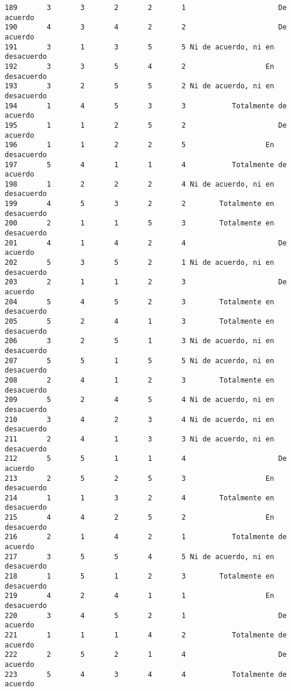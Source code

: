 \documentclass[
  letterpaper,
  DIV=11,
  numbers=noendperiod]{scrartcl}
\begin{document}
\begin{verbatim}
189       3       3       2       2       1                      De acuerdo
190       4       3       4       2       2                      De acuerdo
191       3       1       3       5       5 Ni de acuerdo, ni en desacuerdo
192       3       3       5       4       2                   En desacuerdo
193       3       2       5       5       2 Ni de acuerdo, ni en desacuerdo
194       1       4       5       3       3           Totalmente de acuerdo
195       1       1       2       5       2                      De acuerdo
196       1       1       2       2       5                   En desacuerdo
197       5       4       1       1       4           Totalmente de acuerdo
198       1       2       2       2       4 Ni de acuerdo, ni en desacuerdo
199       4       5       3       2       2        Totalmente en desacuerdo
200       2       1       1       5       3        Totalmente en desacuerdo
201       4       1       4       2       4                      De acuerdo
202       5       3       5       2       1 Ni de acuerdo, ni en desacuerdo
203       2       1       1       2       3                      De acuerdo
204       5       4       5       2       3        Totalmente en desacuerdo
205       5       2       4       1       3        Totalmente en desacuerdo
206       3       2       5       1       3 Ni de acuerdo, ni en desacuerdo
207       5       5       1       5       5 Ni de acuerdo, ni en desacuerdo
208       2       4       1       2       3        Totalmente en desacuerdo
209       5       2       4       5       4 Ni de acuerdo, ni en desacuerdo
210       3       4       2       3       4 Ni de acuerdo, ni en desacuerdo
211       2       4       1       3       3 Ni de acuerdo, ni en desacuerdo
212       5       5       1       1       4                      De acuerdo
213       2       5       2       5       3                   En desacuerdo
214       1       1       3       2       4        Totalmente en desacuerdo
215       4       4       2       5       2                   En desacuerdo
216       2       1       4       2       1           Totalmente de acuerdo
217       3       5       5       4       5 Ni de acuerdo, ni en desacuerdo
218       1       5       1       2       3        Totalmente en desacuerdo
219       4       2       4       1       1                   En desacuerdo
220       3       4       5       2       1                      De acuerdo
221       1       1       1       4       2           Totalmente de acuerdo
222       2       5       2       1       4                      De acuerdo
223       5       4       3       4       4           Totalmente de acuerdo

\end{verbatim}
\end{document}
